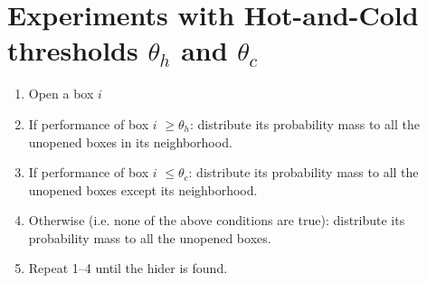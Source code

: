 \documentclass[11pt,a4paper,draft]{article}
\begin{document}
\section{Experiments with Hot-and-Cold thresholds $\theta_h$ and $\theta_c$}
\begin{enumerate}
	\item Open a box $i$
	\item If performance of box $i$ $\geq \theta_h$: distribute its probability mass to all the unopened boxes in its neighborhood. 
	\item If performance of box $i$ $\leq \theta_c$: distribute its probability mass to all the unopened boxes except its neighborhood.
	\item Otherwise (i.e. none of the above conditions are true): distribute its probability mass to all the unopened boxes.
	\item Repeat 1--4 until the hider is found.
\end{enumerate}
\centering
\end{document}
